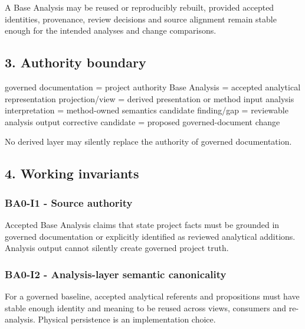 \documentclass[
  10pt,
  a4paper,
]{article}
\newenvironment{Shaded}{}{}
\newcommand{\NormalTok}[1]{#1}
\begin{document}
A Base Analysis may be reused or reproducibly rebuilt, provided accepted
identities, provenance, review decisions and source alignment remain
stable enough for the intended analyses and change comparisons.

\subsection{3. Authority boundary}\label{3-authority-boundary}

\begin{Shaded}
\begin{Highlighting}[]
\NormalTok{governed documentation  = project authority}
\NormalTok{Base Analysis            = accepted analytical representation}
\NormalTok{projection/view          = derived presentation or method input}
\NormalTok{analysis interpretation  = method{-}owned semantics}
\NormalTok{candidate finding/gap    = reviewable analysis output}
\NormalTok{corrective candidate     = proposed governed{-}document change}
\end{Highlighting}
\end{Shaded}

No derived layer may silently replace the authority of governed
documentation.

\subsection{4. Working invariants}\label{4-working-invariants}

\subsubsection{BA0-I1 - Source
authority}\label{ba0-i1---source-authority}

Accepted Base Analysis claims that state project facts must be grounded
in governed documentation or explicitly identified as reviewed
analytical additions. Analysis output cannot silently create governed
project truth.

\subsubsection{BA0-I2 - Analysis-layer semantic
canonicality}\label{ba0-i2---analysis-layer-semantic-canonicality}

For a governed baseline, accepted analytical referents and propositions
must have stable enough identity and meaning to be reused across views,
consumers and re-analysis. Physical persistence is an implementation
choice.
\end{document}
